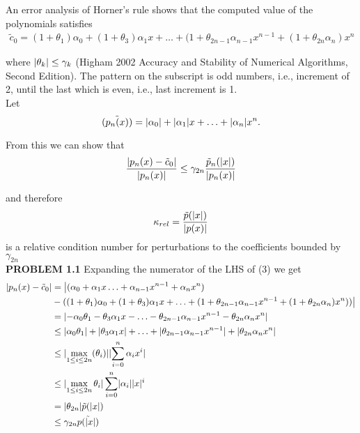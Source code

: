 \documentclass[12pt]{article}
\DeclarePairedDelimiter \abs{\lvert}{\rvert}%
\theoremstyle{remark}
\begin{document}
An error analysis of Horner's rule shows that the computed value of the polynomials satisfies 
\begin{align}
	\tilde{c}_0 = (1 + \theta_1)\alpha_0 + (1 + \theta_3)\alpha_1x + \ldots + (1 + \theta_{2n-1}\alpha_{n-1}x^{n-1} + (1 + \theta_{2n}\alpha_n)x^n
\end{align} 

where $\abs{\theta_k} \leq \gamma_k$ (Higham 2002 Accuracy and Stability of Numerical Algorithms, Second Edition). The pattern on the subscript is odd numbers, i.e., increment of 2, until the last which is even, i.e., last increment is 1. \\
Let 
$$ \tilde{(p_n(x))} = \abs{\alpha_0} + \abs{\alpha_1}x + \ldots + \abs{\alpha_n}x^n. $$

From this we can show that 
\begin{align}
	\frac{\abs{p_n(x) - \tilde{c}_0}}{\abs{p_n(x)}} \leq \gamma_{2n} \frac{\tilde{p}_n(\abs{x})}{\abs{p_n(x)}}
\end{align}

and therefore
$$ \kappa_{rel} = \frac{\tilde{p}(\abs{x})}{\abs{p(x)}} $$
is a relative condition number for perturbations to the coefficients bounded by $\gamma_{2n}$ \\

\textbf{PROBLEM 1.1}
Expanding the numerator of the LHS of (3) we get
\begin{align*}
	\abs{p_n(x) - \tilde{c}_0} & = \big\vert(\alpha_0 + \alpha_1x \ldots + \alpha_{n-1}x^{n-1} + \alpha_nx^n) \\
		 & - ((1 + \theta_1)\alpha_0 + (1 + \theta_3)\alpha_1x + \ldots + (1 + \theta_{2n-1}\alpha_{n-1}x^{n-1} + (1 + \theta_{2n}\alpha_n)x^n))\big\vert \\
		 & = \abs{-\alpha_0\theta_1 - \theta_3\alpha_1 x - \ldots - \theta_{2n-1}\alpha_{n-1}x^{n-1} - \theta_{2n}\alpha_nx^n} \\
		 & \leq \abs{\alpha_0\theta_1} + \abs{\theta_3\alpha_1x} + \ldots + \abs{\theta_{2n-1}\alpha_{n-1}x^{n-1}} + \abs{\theta_{2n}\alpha_nx^n} \\ 
		& \leq \abs{\max\limits_{1 \leq i \leq 2n}(\theta_i)}\abs{\sum\limits_{i=0}^n \alpha_i x^i} \\
		& \leq \abs{\max\limits_{1 \leq i \leq 2n} \theta_i}\sum\limits_{i=0}^n \abs{\alpha_i}\abs{x}^i \\
		& = \abs{\theta_{2n}}\tilde{p}(\abs{x}) \\
		& \leq \gamma_{2n}\tilde{p(\abs{x})}
\end{align*}
\end{document}
